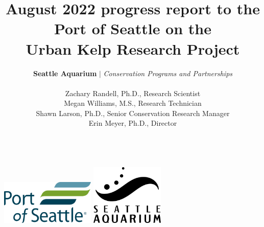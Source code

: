 \documentclass[11pt]{article}
\title{
August 2022 progress report to the Port of Seattle on the
\\
Urban Kelp Research Project
\\
}
\author{
\Large{
\textbf{Seattle Aquarium} 
$\vert$ 
\textit{Conservation Programs and Partnerships}
}
\\
\large{
Zachary Randell, Ph.D., Research Scientist
\\
Megan Williams, M.S., Research Technician

Shawn Larson, Ph.D., Senior Conservation Research Manager
\\
Erin Meyer, Ph.D., Director
}
\\
\vspace{10pt}
}
\begin{document}
\begin{titlepage}
\maketitle
\tableofcontents
\vfill

\vspace{20pt}
\centering
\includegraphics[width=4.5cm]{Port_logo.png}
\hspace{20pt}
\includegraphics[width=3.5cm]{logo.jpg}
\\

\end{titlepage}




\end{document}
